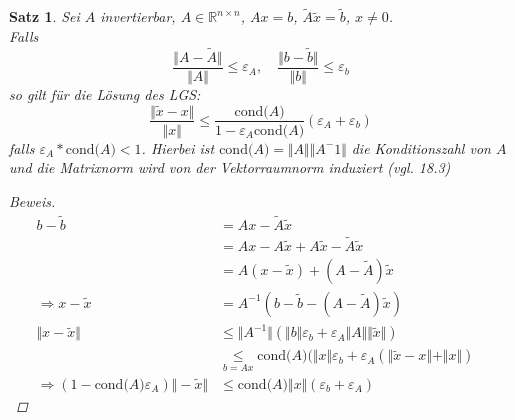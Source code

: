 \documentclass[12pt]{article}
\theoremstyle{break}
\newtheorem{theorem}{Satz}[subsection]
\begin{document}
\begin{theorem}
Sei $A$ invertierbar, $A \in \mathbb{R}^{n \times n}$, $Ax = b$, $\tilde{A} \tilde{x} = \tilde{b}$, $x \neq 0$. \\
Falls 
$$ \frac{\Vert A - \tilde{A} \Vert}{\Vert A \Vert} \leq \varepsilon_A, \quad \frac{\Vert b - \tilde{b} \Vert}{\Vert b \Vert} \leq \varepsilon_b$$
so gilt für die Lösung des LGS:
$$\frac{\Vert \tilde{x} - x \Vert }{\Vert x \Vert} \leq \frac{\text{cond($A$)}}{1- \varepsilon_A \text{cond($A$)}}(\varepsilon_A + \varepsilon_b)$$
falls $\varepsilon_A *\text{cond($A$)} < 1$. Hierbei ist $\text{cond($A$)} = \Vert A \Vert \Vert A^-1 \Vert$ die Konditionszahl von $A$ und die Matrixnorm wird von der Vektorraumnorm induziert (vgl. 18.3)
\begin{proof}[Beweis]
\begin{align*}
b - \tilde{b} &= Ax - \tilde{A}\tilde{x} &\\
&= Ax - A\tilde{x} + A\tilde{x} - \tilde{A}\tilde{x} &\\
&= A(x-\tilde{x}) + (A- \tilde{A})\tilde{x} &\\
\Rightarrow x- \tilde{x} &= A^{-1} (b -\tilde{b} - (A - \tilde{A})\tilde{x}) &\\
\Vert x - \tilde{x} \Vert & \leq \Vert A^{-1} \Vert ( \Vert b \Vert \varepsilon_b + \varepsilon_A \Vert A \Vert \Vert \tilde{x} \Vert ) &\\
& \underset{b=Ax}{\leq} \text{cond($A$)} ( \Vert x \Vert \varepsilon_b + \varepsilon_A (\Vert \tilde{x} - x \Vert + \Vert x \Vert) &\\
\Rightarrow (1- \text{cond($A$)} \varepsilon_A) \Vert - \tilde{x} \Vert & \leq \text{cond($A$)} \Vert x \Vert (\varepsilon_b + \varepsilon_A)
\end{align*}
\end{proof}
\end{theorem}
\end{document}
